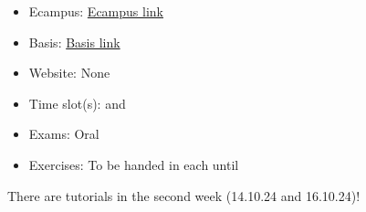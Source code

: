 \begin{tcolorbox}[enhanced,breakable,
	title=General Information,frame style={color=mycolor}]
    \begin{itemize}
        \item Ecampus: \href{https://ecampus.uni-bonn.de/goto_ecampus_crs_3440619.html}{Ecampus link}
        \item Basis: \href{https://basis.uni-bonn.de/qisserver/rds?state=verpublish&status=init&vmfile=no&publishid=247198&moduleCall=webInfo&publishConfFile=webInfo&publishSubDir=veranstaltung}{Basis link}
        \item Website: None
        \item Time slot(s):  and 
        \item Exams: Oral
        \item Exercises: To be handed in each  until 
    \end{itemize}
\end{tcolorbox}


There are tutorials in the second week (14.10.24 and 16.10.24)!
    
